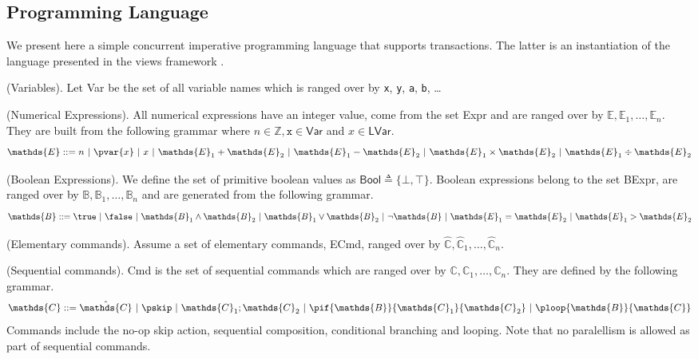 \subsection{Programming Language}
\label{language}

We present here a simple concurrent imperative programming language that supports transactions. The latter is an instantiation of the language presented in the views framework \cite{views}.

\begin{defn}
	(Variables).
	Let \textsf{Var} be the set of all variable names which is ranged over by \texttt{x}, \texttt{y}, \texttt{a}, \texttt{b}, \ldots
\end{defn}

\begin{defn}
	(Numerical Expressions).
	All numerical expressions have an integer value, come from the set \textsf{Expr} and are ranged over by $\mathds{E}, \mathds{E}_1, \ldots, \mathds{E}_n$. They are built from the following grammar where $n \in \mathds{Z}, \mathtt{x} \in \mathsf{Var}$ and $x \in \mathsf{LVar}$.
	\[
		\mathds{E} ::=
			n\
			|\ \pvar{x}\
			|\ x\
			|\ \mathds{E}_1 + \mathds{E}_2\
			|\ \mathds{E}_1 - \mathds{E}_2\
			|\ \mathds{E}_1 \times \mathds{E}_2\
			|\ \mathds{E}_1 \div \mathds{E}_2
	\]
\end{defn}

\begin{defn}
	(Boolean Expressions).
	We define the set of primitive boolean values as $\mathsf{Bool} \triangleq \{ \bot, \top \}$. Boolean expressions belong to the set \textsf{BExpr}, are ranged over by $\mathds{B}, \mathds{B}_1, \ldots, \mathds{B}_n$ and are generated from the following grammar.
	\[
		\mathds{B} ::=
			\true\
			|\ \false\
			|\ \mathds{B}_1 \land \mathds{B}_2\
			|\ \mathds{B}_1 \lor \mathds{B}_2\
			|\ \lnot \mathds{B}\
			|\ \mathds{E}_1 = \mathds{E}_2\
			|\ \mathds{E}_1 > \mathds{E}_2
	\]
\end{defn}

\begin{param}
	(Elementary commands).
	Assume a set of elementary commands, \textsf{ECmd}, ranged over by $\hat{\mathds{C}}, \hat{\mathds{C}}_1, \ldots, \hat{\mathds{C}}_n$.
\end{param}

\begin{defn}
	(Sequential commands).
	\textsf{Cmd} is the set of sequential commands which are ranged over by $\mathds{C}, \mathds{C}_1, \ldots, \mathds{C}_n$. They are defined by the following grammar.
	\[
		\mathds{C} ::=
			\hat{\mathds{C}}\
			|\ \pskip\
			|\ \mathds{C}_1; \mathds{C}_2\
			|\ \pif{\mathds{B}}{\mathds{C}_1}{\mathds{C}_2}\
			|\ \ploop{\mathds{B}}{\mathds{C}}
	\]
	Commands include the no-op skip action, sequential composition, conditional branching and looping. Note that no paralellism is allowed as part of sequential commands.
\end{defn}

